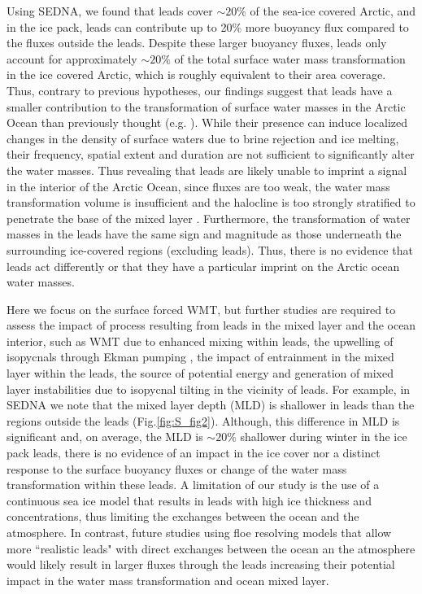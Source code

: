 \documentclass[lineno,sn-basic]{sn-jnl}%
\begin{document}
Using SEDNA, we found that leads cover $\sim 20\%$ of the sea-ice covered Arctic, and in the ice pack, leads can contribute up to 20\% more buoyancy flux compared to the fluxes outside the leads. Despite these larger buoyancy fluxes, leads only account for approximately $\sim 20\%$ of the total surface water mass transformation in the ice covered Arctic, which is roughly equivalent to their area coverage. Thus, contrary to previous hypotheses, our findings suggest that leads have a smaller contribution to the transformation of surface water masses in the Arctic Ocean than previously thought (e.g. \citealp{Hutter_identification_2019, McPhee_LKF_2005}). While their presence can induce localized changes in the density of surface waters due to brine rejection and ice melting, their frequency, spatial extent and duration are not sufficient to significantly alter the water masses. Thus revealing that leads are likely unable to imprint a signal in the interior of the Arctic Ocean, since fluxes are too weak, the water mass transformation volume is insufficient and the halocline is too strongly stratified to penetrate the base of the mixed layer \citep{Lenn_mixing_2022}.
Furthermore, the transformation of water masses in the leads have the same sign and magnitude as those underneath the surrounding ice-covered regions (excluding leads). Thus, there is no evidence that leads act differently or that they have a particular imprint on the Arctic ocean water masses.

Here we focus on the surface forced WMT, but further studies are required to assess the impact of process resulting from leads in the mixed layer and the ocean interior, such as WMT due to enhanced mixing within leads, the upwelling of isopycnals through Ekman pumping \citep{McPhee_LKF_2005}, the impact of entrainment in the mixed layer within the leads, the source of potential energy and generation of mixed layer instabilities due to isopycnal tilting in the vicinity of leads. For example, in SEDNA we note that the mixed layer depth (MLD) is shallower in leads than the regions outside the leads (Fig.\ref{fig:S_fig2}). Although, this difference in MLD is significant and, on average, the MLD is $\sim 20\%$ shallower during winter in the ice pack leads, there is no evidence of an impact in the ice cover nor a distinct response to the surface buoyancy fluxes or change of the water mass transformation within these leads. A limitation of our study is the use of a continuous sea ice model that results in leads with high ice thickness and concentrations, thus limiting the exchanges between the ocean and the atmosphere. In contrast, future studies using floe resolving models that allow more ``realistic leads" with direct exchanges between the ocean an the atmosphere would likely result in larger fluxes through the leads increasing their potential impact in the water mass transformation and ocean mixed layer.
\end{document}
